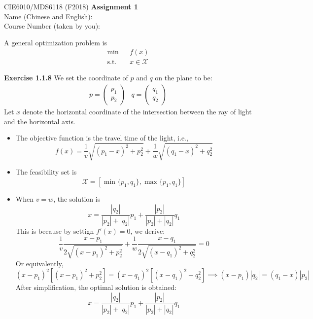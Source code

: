 \documentclass[11pt]{article}
\newcommand{\cX}{\mathcal{X}}
\renewcommand{\st}{\mathrm{s.t.}}
\begin{document}
\begin{center}
{\large CIE6010/MDS6118 (F2018)}
{\Large\bf Assignment 1}\\[.2in]
Name (Chinese and English): \underline{\hspace*{2in}}\\[.1in]
Course Number (taken by you): \underline{\hspace{2in}}
\end{center}
\medskip


A general optimization problem is
\begin{eqnarray*}
\min && f(x) \\
\st && x \in \cX
\end{eqnarray*}

{\bf Exercise 1.1.8}
We set the coordinate of $p$ and $q$ on the plane to be:
\[
\begin{array}{ll}
p=\begin{pmatrix}
p_1\\p_2
\end{pmatrix}
&
q=\begin{pmatrix}
q_1\\q_2
\end{pmatrix}
\end{array}
\]
Let $x$ denote the horizontal coordinate of the intersection between the ray of light and the horizontal axis.



\begin{itemize}
\item The objective function is the travel time of the light, i.e.,
\[
f(x) = \frac{1}{v}\sqrt{(p_1-x)^2+p_2^2}+\frac{1}{w}\sqrt{(q_1-x)^2+q_2^2}
\]

\item The feasibility set is
\[
\cX = [\min\{p_1,q_1\},\max\{p_1,q_1\}]
\]

\item When $v=w$, the solution is
\[
x = \frac{|q_2|}{|p_2|+|q_2|}p_1+\frac{|p_2|}{|p_2|+|q_2|}q_1
\]
This is because by settign $f'(x)=0$, we derive:
\[
\frac{1}{v}\frac{x-p_1}{2\sqrt{(x-p_1)^2+p_2^2}}+\frac{1}{w}\frac{x-q_1}{2\sqrt{(x-q_1)^2+q_2^2}}=0
\]
Or equivalently,
\[
(x-p_1)^2[(x-p_1)^2+p_2^2]=(x-q_1)^2[(x-q_1)^2+q_2^2]
\implies (x-p_1)|q_2| = (q_1-x)|p_2|
\]
After simplification, the optimal solution is obtained:
\[
x=\frac{|q_2|}{|p_2|+|q_2|}p_1+\frac{|p_2|}{|p_2|+|q_2|}q_1
\]
\end{itemize}



\clearpage
\end{document}
